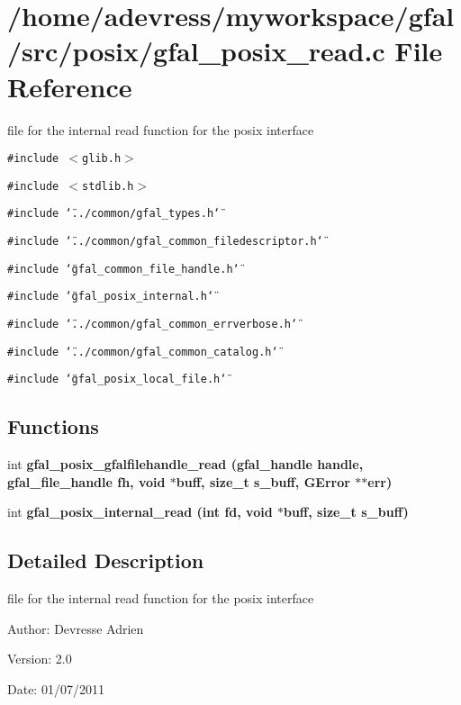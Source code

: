 \section{/home/adevress/myworkspace/gfal/src/posix/gfal\_\-posix\_\-read.c File Reference}
\label{gfal__posix__read_8c}
file for the internal read function for the posix interface 

{\tt \#include $<$glib.h$>$}\par
{\tt \#include $<$stdlib.h$>$}\par
{\tt \#include \char`\"{}../common/gfal\_\-types.h\char`\"{}}\par
{\tt \#include \char`\"{}../common/gfal\_\-common\_\-filedescriptor.h\char`\"{}}\par
{\tt \#include \char`\"{}gfal\_\-common\_\-file\_\-handle.h\char`\"{}}\par
{\tt \#include \char`\"{}gfal\_\-posix\_\-internal.h\char`\"{}}\par
{\tt \#include \char`\"{}../common/gfal\_\-common\_\-errverbose.h\char`\"{}}\par
{\tt \#include \char`\"{}../common/gfal\_\-common\_\-catalog.h\char`\"{}}\par
{\tt \#include \char`\"{}gfal\_\-posix\_\-local\_\-file.h\char`\"{}}\par
\subsection*{Functions}
\begin{CompactItemize}
\item 
int \bf{gfal\_\-posix\_\-gfalfilehandle\_\-read} (gfal\_\-handle handle, gfal\_\-file\_\-handle fh, void $\ast$buff, size\_\-t s\_\-buff, GError $\ast$$\ast$err)
\item 
int \bf{gfal\_\-posix\_\-internal\_\-read} (int fd, void $\ast$buff, size\_\-t s\_\-buff)
\end{CompactItemize}


\subsection{Detailed Description}
file for the internal read function for the posix interface 

\begin{Desc}
\item[Author:]Devresse Adrien \end{Desc}
\begin{Desc}
\item[Version:]2.0 \end{Desc}
\begin{Desc}
\item[Date:]01/07/2011 \end{Desc}


